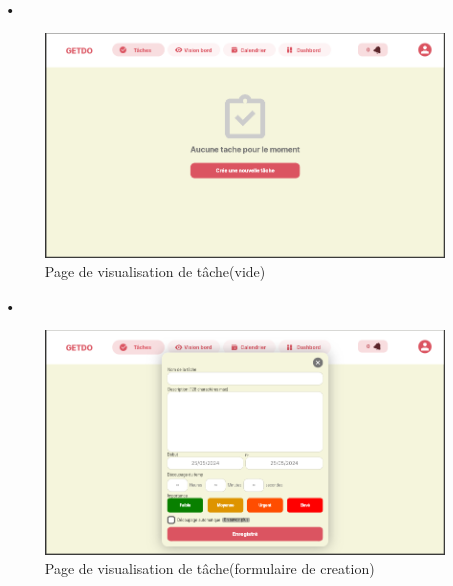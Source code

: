\documentclass[a4paper,12pt]{report}
\begin{document}
\begin{itemize}
      \item[•]\begin{figure}[h!]
          \includegraphics[width=1\textwidth]{./images/getdo_screenshot/getdo_task_empty.png}
          \caption{Page de visualisation de tâche(vide)}
          \label{fig:jira_project_task}
        \end{figure}
        
      \item[•]\begin{figure}[h!]
          \includegraphics[width=1\textwidth]{./images/getdo_screenshot/getdo_task_form.png}
          \caption{Page de visualisation de tâche(formulaire de creation)}
          \label{fig:jira_project_task}
        \end{figure}
        

\end{itemize}
\end{document}

